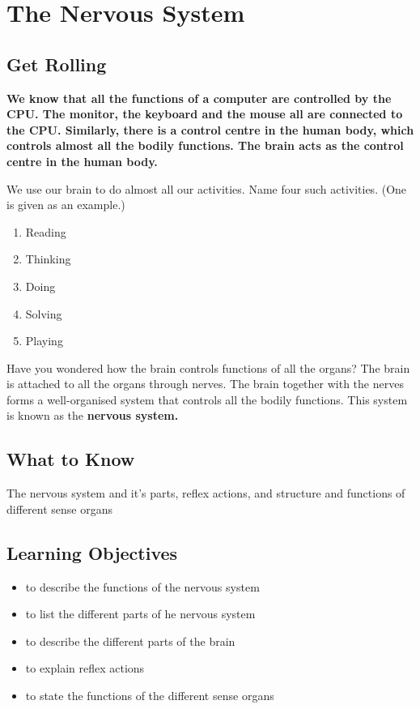 \chapter{The Nervous System}
\section{Get Rolling}
\textbf{We know that all the functions of a computer are controlled by the CPU. The monitor, the keyboard and the mouse all are connected to the CPU. Similarly, there is a control centre in the human body, which controls almost all the bodily functions. The brain acts as the control centre in the human body.}
\par
\vspace{0.1in}
We use our brain to do almost all our activities. Name four such activities. (One is given as an example.)
\begin{enumerate}
    \item Reading
    \item Thinking
    \item Doing
    \item Solving
    \item Playing
\end{enumerate}
Have you wondered how the brain controls functions of all the organs? The brain is attached to all the organs through nerves. The brain together with the nerves forms a well-organised system that controls all the bodily functions. This system is known as the \textbf{nervous system.}
\section{What to Know}
The nervous system and it's parts, reflex actions, and structure and functions of different sense organs
\section{\textbf{Learning Objectives}}
\begin{itemize}
    \item to describe the functions of the nervous system
    \item to list the different parts of he nervous system
    \item to describe the different parts of the brain
    \item to explain reflex actions
    \item to state the functions of the different sense organs
\end{itemize}
